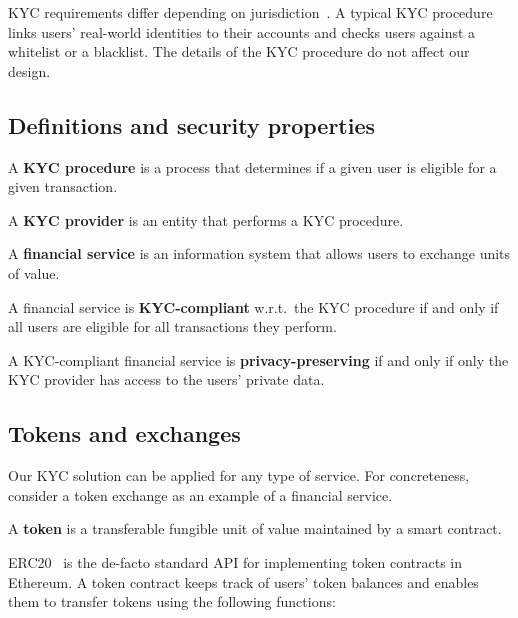 KYC requirements differ depending on jurisdiction~\cite{PWC2015}.
A typical KYC procedure links users' real-world identities to their accounts and checks users against a whitelist or a blacklist.
The details of the KYC procedure do not affect our design.

\subsection{Definitions and security properties}

\begin{definition}
	A \textbf{KYC procedure} is a process that determines if a given user is eligible for a given transaction.
\end{definition}

\begin{definition}
	A \textbf{KYC provider} is an entity that performs a KYC procedure.
\end{definition}

\begin{definition}
	A \textbf{financial service} is an information system that allows users to exchange units of value.
\end{definition}

\begin{definition}
	A financial service is \textbf{KYC-compliant} w.r.t.~the KYC procedure if and only if all users are eligible for all transactions they perform.
\end{definition}

\begin{definition}
	A KYC-compliant financial service is \textbf{privacy-preserving} if and only if only the KYC provider has access to the users' private data.
\end{definition}


\subsection{Tokens and exchanges}

Our KYC solution can be applied for any type of service.
For concreteness, consider a token exchange as an example of a financial service.

\begin{definition}
	A \textbf{token} is a transferable fungible unit of value maintained by a smart contract.
\end{definition}

ERC20~\cite{Victor2019} is the de-facto standard API for implementing token contracts in Ethereum.
A token contract keeps track of users' token balances and enables them to transfer tokens using the following functions:

